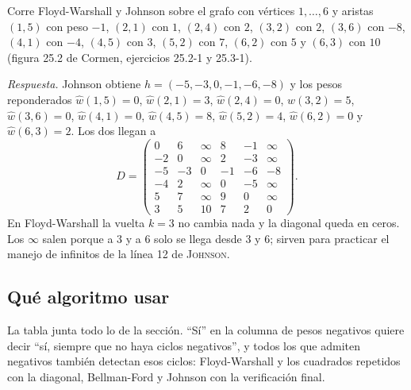 \documentclass[11pt,letterpaper]{article}
\begin{document}
\begin{ejercicio}
  Corre Floyd-Warshall y Johnson sobre el grafo con vértices
  $1, \dots, 6$ y aristas $(1, 5)$ con peso $-1$, $(2, 1)$ con $1$,
  $(2, 4)$ con $2$, $(3, 2)$ con $2$, $(3, 6)$ con $-8$, $(4, 1)$ con
  $-4$, $(4, 5)$ con $3$, $(5, 2)$ con $7$, $(6, 2)$ con $5$ y
  $(6, 3)$ con $10$ (figura 25.2 de Cormen, ejercicios 25.2-1 y
  25.3-1).

  \emph{Respuesta.} Johnson obtiene $h = (-5, -3, 0, -1, -6, -8)$ y
  los pesos reponderados $\hat{w}(1, 5) = 0$, $\hat{w}(2, 1) = 3$,
  $\hat{w}(2, 4) = 0$, $\hat{w}(3, 2) = 5$, $\hat{w}(3, 6) = 0$,
  $\hat{w}(4, 1) = 0$, $\hat{w}(4, 5) = 8$, $\hat{w}(5, 2) = 4$,
  $\hat{w}(6, 2) = 0$ y $\hat{w}(6, 3) = 2$. Los dos llegan a
  \[
    D = \begin{pmatrix}
      0 & 6 & \infty & 8 & -1 & \infty \\
      -2 & 0 & \infty & 2 & -3 & \infty \\
      -5 & -3 & 0 & -1 & -6 & -8 \\
      -4 & 2 & \infty & 0 & -5 & \infty \\
      5 & 7 & \infty & 9 & 0 & \infty \\
      3 & 5 & 10 & 7 & 2 & 0
    \end{pmatrix} .
  \]
  En Floyd-Warshall la vuelta $k = 3$ no cambia nada y la diagonal
  queda en ceros. Los $\infty$ salen porque a $3$ y a $6$ solo se
  llega desde $3$ y $6$; sirven para practicar el manejo de infinitos
  de la línea 12 de \textsc{Johnson}.
\end{ejercicio}


\subsection*{Qué algoritmo usar}

La tabla junta todo lo de la sección. ``Sí'' en la columna de pesos
negativos quiere decir ``sí, siempre que no haya ciclos negativos'', y
todos los que admiten negativos también detectan esos ciclos:
Floyd-Warshall y los cuadrados repetidos con la diagonal, Bellman-Ford
y Johnson con la verificación final.
\end{document}
